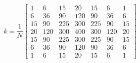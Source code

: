 \[
k=\frac{1}{N}
	\begin{bmatrix}
	  1 & 6 & 15 & 20 & 15 & 6 & 1 \\
	  6 & 36 & 90 & 120 & 90 & 36 & 6 \\
	 15 & 90 & 225 & 300 & 225 & 90 & 15 \\
	 20 & 120 & 300 & 400 & 300 & 120 & 20 \\
	 15 & 90 & 225 & 300 & 225 & 90 & 15 \\ 
	  6 & 36 & 90 & 120 & 90 & 36 & 6 \\
	  1 & 6 & 15 & 20 & 15 & 6 & 1
	\end{bmatrix}
\]

